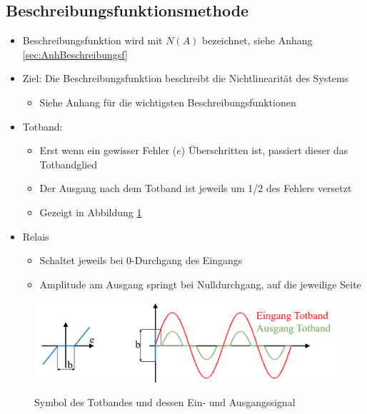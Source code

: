 \subsection{Beschreibungsfunktionsmethode}
\begin{itemize}
	\item Beschreibungsfunktion wird mit $N(A)$ bezeichnet, siehe Anhang \ref{sec:AnhBeschreibungsf}
	\item Ziel: Die Beschreibungsfunktion beschreibt die Nichtlinearität des Systems
	\begin{itemize}
		\item Siehe Anhang für die wichtigsten Beschreibungsfunktionen
	\end{itemize}
	\item Totband:
	\begin{itemize}
		\item Erst wenn ein gewisser Fehler ($e$) Überschritten ist, passiert dieser das Totbandglied
		\item Der Ausgang nach dem Totband ist jeweils um 1/2 des Fehlers versetzt
		\item Gezeigt in Abbildung \ref{fig:totband}
	\end{itemize}
	\item Relais
	\begin{itemize}
		\item Schaltet jeweils bei 0-Durchgang des Eingangs
		\item Amplitude am Ausgang springt bei Nulldurchgang, auf die jeweilige Seite 
	\end{itemize}
\end{itemize}
\begin{figure}[!h]
	\centering
	\includegraphics[width=0.5\linewidth]{./bilder/totband.png}
	\label{fig:totband}
	\caption{Symbol des Totbandes und dessen Ein- und Ausgangssignal}
\end{figure}

